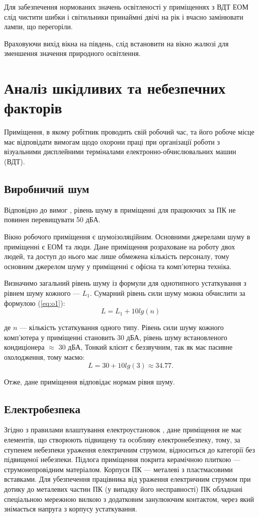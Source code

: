 \documentclass{thesis_utf8}
\begin{document}
Для забезпечення нормованих значень освітленості у приміщеннях з ВДТ ЕОМ слід чистити шибки і світильники принаймні двічі на рік і вчасно замінювати лампи, що перегоріли.

Враховуючи вихід вікна на південь, слід встановити на вікно жалюзі для зменшення значення природного освітлення.

\section{Аналіз шкідливих та небезпечних факторів}
Приміщення, в якому робітник проводить свій робочий час, та його робоче місце має відповідати вимогам щодо охорони праці при організації роботи з візуальними дисплейними терміналами електронно-обчислювальних машин (ВДТ).

\subsection{Виробничий шум}
Відповідно до вимог \cite{OOP4}, рівень шуму в приміщенні для працюючих за ПК не повинен перевищувати 50 дБА.

Вікно робочого приміщення є шумоізоляційним. Основними джерелами шуму в приміщенні є ЕОМ та люди. Дане приміщення розраховане на роботу двох людей, та доступ до нього має лише обмежена кількість персоналу, тому основним джерелом шуму у приміщенні є офісна та комп'ютерна техніка.

Визначимо загальний рівень шуму із формули для однотипного устаткування з рівнем шуму кожного --- $L_1$. Сумарний рівень сили шуму можна обчислити за формулою (\ref{eq:o1}):
\begin{equation}
    L = L_1 + 10lg(n)
    \label{eq:o1}
\end{equation}

де $n$ --- кількість устаткування одного типу. Рівень сили шуму кожного комп'ютера у приміщенні становить 30 дБА, рівень шуму встановленого кондиціонера $\approx$ 30 дБА, Тонкий клієнт є беззвучним, так як має пасивне охолодження, тому маємо:
\begin{equation}
    L = 30 + 10lg(3) \approx 34.77.
    \nonumber
\end{equation}

Отже, дане приміщення відповідає нормам рівня шуму.

\subsection{Електробезпека}
Згідно з правилами влаштування електроустановок \cite{OOP5}, дане приміщення не має елементів, що створюють підвищену та особливу електронебезпеку, тому, за ступенем небезпеки ураження електричним струмом, відноситься до категорії без підвищеної небезпеки.
Підлога приміщення покрита керамічною плиткою --- струмонепровідним матеріалом.
Корпуси ПК --- металеві з пластмасовими вставками. Для убезпечення працівника від ураження електричним струмом при дотику до металевих частин ПК (у випадку його несправності) ПК обладнані спеціальною мережною вилкою з додатковим занулюючим контактом, через який знімається напруга з корпусу устаткування.
\end{document}
